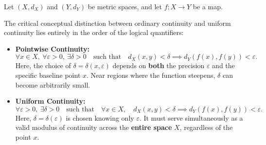 \begin{content}
Let $(X, d_X)$ and $(Y, d_Y)$ be metric spaces, and let $f \colon X \to Y$ be a map.


\begin{steps}
The critical conceptual distinction between ordinary continuity and uniform continuity lies entirely in the order of the logical quantifiers:
\begin{itemize}
    \item \textbf{Pointwise Continuity:}
    \[
    \forall x \in X, \ \forall \varepsilon > 0, \ \exists \delta > 0 \quad \text{such that} \quad d_X(x, y) < \delta \implies d_Y(f(x), f(y)) < \varepsilon.
    \]
    Here, the choice of $\delta = \delta(x, \varepsilon)$ depends on \textbf{both} the precision $\varepsilon$ and the specific baseline point $x$. Near regions where the function steepens, $\delta$ can become arbitrarily small.
    \item \textbf{Uniform Continuity:}
    \[
    \forall \varepsilon > 0, \ \exists \delta > 0 \quad \text{such that} \quad \forall x \in X, \quad d_X(x, y) < \delta \implies d_Y(f(x), f(y)) < \varepsilon.
    \]
    Here, $\delta = \delta(\varepsilon)$ is chosen knowing only $\varepsilon$. It must serve simultaneously as a valid modulus of continuity across the \textbf{entire space} $X$, regardless of the point $x$.
\end{itemize}
\end{steps}
\end{content}

